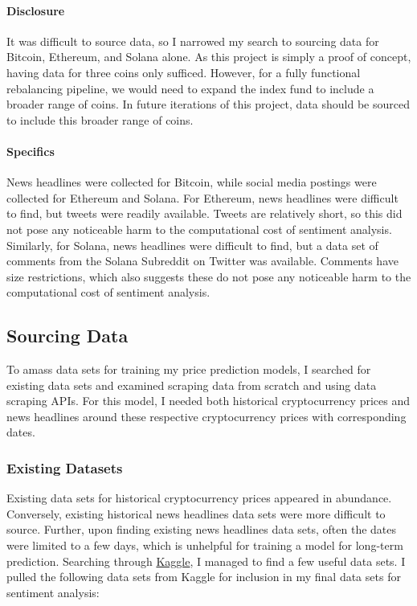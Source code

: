 \documentclass[10pt,twocolumn]{article}
\begin{document}
\paragraph{Disclosure} It was difficult to source data, so I narrowed my search to sourcing data for Bitcoin, Ethereum, and Solana alone. As this project is simply a proof of concept, having data for three coins only sufficed. However, for a fully functional rebalancing pipeline, we would need to expand the index fund to include a broader range of coins. In future iterations of this project, data should be sourced to include this broader range of coins.

\paragraph{Specifics} News headlines were collected for Bitcoin, while social media postings were collected for Ethereum and Solana. For Ethereum, news headlines were difficult to find, but tweets were readily available. Tweets are relatively short, so this did not pose any noticeable harm to the computational cost of sentiment analysis. Similarly, for Solana, news headlines were difficult to find, but a data set of comments from the Solana Subreddit on Twitter was available. Comments have size restrictions, which also suggests these do not pose any noticeable harm to the computational cost of sentiment analysis.

\subsection{Sourcing Data}

To amass data sets for training my price prediction models, I searched for existing data sets and examined scraping data from scratch and using data scraping APIs. For this model, I needed both historical cryptocurrency prices and news headlines around these respective cryptocurrency prices with corresponding dates.

\subsubsection{Existing Datasets}

Existing data sets for historical cryptocurrency prices appeared in abundance. Conversely, existing historical news headlines data sets were more difficult to source. Further, upon finding existing news headlines data sets, often the dates were limited to a few days, which is unhelpful for training a model for long-term prediction. Searching through \href{https://www.kaggle.com}{Kaggle}, I managed to find a few useful data sets. I pulled the following data sets from Kaggle for inclusion in my final data sets for sentiment analysis:
\end{document}

